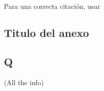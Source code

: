 \documentclass[a4paper,12pt]{article}
\begin{document}
Para una correcta citación, usar \cite{citacion}\cite{moreno2011como}


\medskip



\begin{appendices}
\makeatletter
{}

\chapter{Titulo del anexo}
\section{Q}

(All the info)

\end{appendices}
\end{document}
